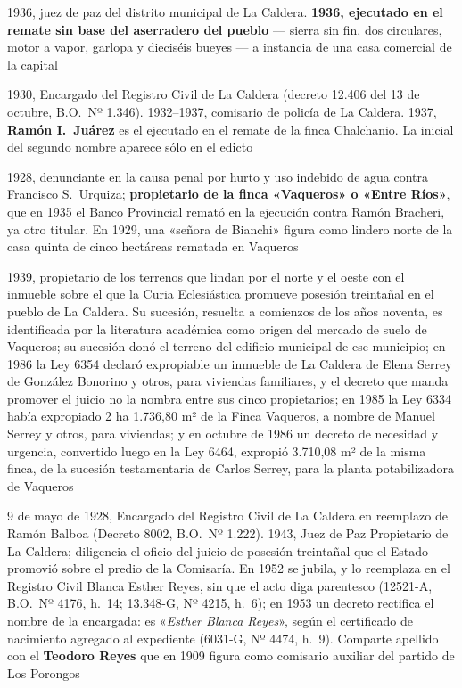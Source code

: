 \begin{personas}
\item[{\textbf{Rafael Delgado\index{Delgado, Rafael}}}] 1936, juez de paz del distrito municipal de La Caldera. \textbf{1936, ejecutado en el remate sin base del aserradero del pueblo} --- sierra sin fin, dos circulares, motor a vapor, garlopa y dieciséis bueyes --- a instancia de una casa comercial de la capital

\item[{\textbf{Ramón Juárez\index{Juárez, Ramón}}}] 1930, Encargado del Registro Civil de La Caldera (decreto 12.406 del 13 de octubre, B.O.\ Nº 1.346). 1932--1937, comisario de policía de La Caldera. 1937, \textbf{Ramón I.\ Juárez} es el ejecutado en el remate de la finca Chalchanio. La inicial del segundo nombre aparece sólo en el edicto

\item[{\textbf{Juan A.\ Bianchi\index{Bianchi, Juan A.}}}] 1928, denunciante en la causa penal por hurto y uso indebido de agua contra Francisco S.\ Urquiza; \textbf{propietario de la finca «Vaqueros» o «Entre Ríos»}, que en 1935 el Banco Provincial remató en la ejecución contra Ramón Bracheri, ya otro titular. En 1929, una «señora de Bianchi» figura como lindero norte de la casa quinta de cinco hectáreas rematada en Vaqueros

\item[{\textbf{Carlos Serrey\index{Serrey, Carlos}}}] 1939, propietario de los terrenos que lindan por el norte y el oeste con el inmueble sobre el que la Curia Eclesiástica promueve posesión treintañal en el pueblo de La Caldera. Su sucesión, resuelta a comienzos de los años noventa, es identificada por la literatura académica como origen del mercado de suelo de Vaqueros; su sucesión donó el terreno del edificio municipal de ese municipio; en 1986 la Ley 6354 declaró expropiable un inmueble de La Caldera de Elena Serrey de González Bonorino y otros, para viviendas familiares, y el decreto que manda promover el juicio no la nombra entre sus cinco propietarios; en 1985 la Ley 6334 había expropiado 2 ha 1.736,80 m² de la Finca Vaqueros, a nombre de Manuel Serrey y otros, para viviendas; y en octubre de 1986 un decreto de necesidad y urgencia, convertido luego en la Ley 6464, expropió 3.710,08 m² de la misma finca, de la sucesión testamentaria de Carlos Serrey, para la planta potabilizadora de Vaqueros

\item[{\textbf{Teófilo Reyes\index{Reyes, Teófilo}}}] 9 de mayo de 1928, Encargado del Registro Civil de La Caldera en reemplazo de Ramón Balboa (Decreto 8002, B.O.\ Nº 1.222). 1943, Juez de Paz Propietario de La Caldera; diligencia el oficio del juicio de posesión treintañal que el Estado promovió sobre el predio de la Comisaría. En 1952 se jubila, y lo reemplaza en el Registro Civil Blanca Esther Reyes, sin que el acto diga parentesco (12521-A, B.O.\ Nº 4176, h.\ 14; 13.348-G, Nº 4215, h.\ 6); en 1953 un decreto rectifica el nombre de la encargada: es «\textit{Esther Blanca Reyes}», según el certificado de nacimiento agregado al expediente (6031-G, Nº 4474, h.\ 9). Comparte apellido con el \textbf{Teodoro Reyes} que en 1909 figura como comisario auxiliar del partido de Los Porongos


\end{personas}
